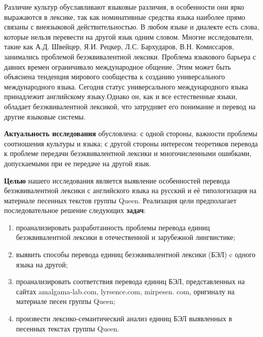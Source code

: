 
\par Различие культур обуславливают языковые различия, в особенности они ярко выражаются   в лексике, так как номинативные средства языка наиболее прямо связаны с внеязыковой действительностью. В любом языке и диалекте есть слова, которые нельзя перевести на другой язык одним словом. Многие исследователи, такие как  А.Д. Швейцер,  Я.И. Рецкер, Л.С. Бархударов, В.Н. Комиссаров,  занимались проблемой безэквивалентной лексики. Проблема языкового барьера с давних времен ограничивало международное общение. Этим может быть объяснена тенденция мирового сообщества к созданию универсального международного языка. Сегодня статус универсального международного языка принадлежит английскому языку.Однако он, как и все естественные языки, обладает безэквивалентной лексикой, что затрудняет его понимание и перевод на другие языковые системы.

\par \textbf{Актуальность исследования} обусловлена: с одной стороны, важности  проблемы соотношения  культуры и языка; с другой стороны интересом теоретиков перевода к проблеме передачи безэквивалентной лексики и многочисленными ошибками, допускаемыми при ее передаче на другой язык.

\par \textbf{Целью} нашего исследования является выявление особенностей перевода безэквивалентной лексики с английского языка на русский и её типологизация на материале песенных текстов группы Queen. Реализация цели предполагает последовательное решение следующих \textbf{задач}:
\begin{enumerate}
    \item проанализировать разработанность проблемы перевода  единиц безэквивалентной лексики в отечественной и зарубежной лингвистике;
    \item  выявить способы  перевода единиц безэквивалентной лексики (БЭЛ) c одного языка на другой;
    \item проанализировать соответствия перевода единиц БЭЛ, представленных на сайтах amalgama-lab.com, lyrsence.com, mirpesen. com, оригиналу на  материале песен группы Queen;
\item произвести лексико-семантический анализ единиц БЭЛ выявленных в песенных текстах группы Queen.
\end{enumerate} 

